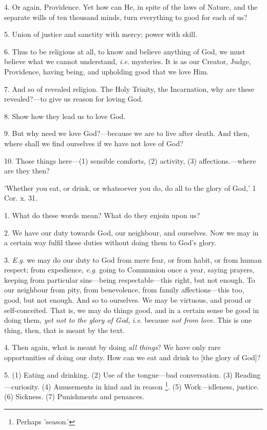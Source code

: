 4. Or again, Providence. Yet how can He, in spite
of the laws of Nature, and the separate wills of ten thousand minds,
turn everything to good for each of us?

5. Union of justice and sanctity with mercy;
power with skill.

6. Thus to be religious at all, to know and
believe anything of God, we must believe what we cannot understand, \emph{i.e}.
mysteries. It is as our Creator, Judge, Providence, having being, and
upholding good that we love Him.

7. And so of revealed religion. The Holy Trinity,
the Incarnation, why are these revealed?—to give us reason for
loving God.

8. Show how they lead us to love God.

9. But why need we love God?—because we are to
live after death. And then, where shall we find ourselves if we have
not love of God?

10. Those things here—(1) sensible comforts,
(2) activity, (3) affections.—where are they then?


'Whether you eat, or drink, or whatsoever you do,
do all to the glory of God,' 1 Cor. x. 31.

1. What do these words mean? What do they enjoin
upon us?

2. We have our duty towards God, our neighbour,
and ourselves. Now we may in a certain way fulfil these duties without
doing them to God's glory.

3. \emph{E.g}. we may do our duty to God from
mere fear, or from habit, or from human respect; from expedience, \emph{e.g}.
going to Communion once a year, saying prayers, keeping from
particular sins—being respectable—this right, but not enough. To
our neighbour from pity, from benevolence, from family
affections—this too, good, but not enough. And so to ourselves. We
may be virtuous, and proud or self-conceited. That is, we may do
things good, and in a certain sense be good in doing them, \emph{yet not
to the glory of God}, \emph{i.e}. because \emph{not from love}.
This is one thing, then, that is meant by the text.

4. Then again, what is meant by doing \emph{all
things}? We have only rare opportunities of doing our duty. How can
we eat and drink to [the glory of God]?

5. (1) Eating and drinking. (2) Use of the
tongue—bad conversation. (3) Reading—curiosity. (4) Amusements in
kind and in reason \footnote{Perhaps 'season.'}.
(5) Work—idleness, justice. (6) Sickness. (7) Punishments and
penances.

